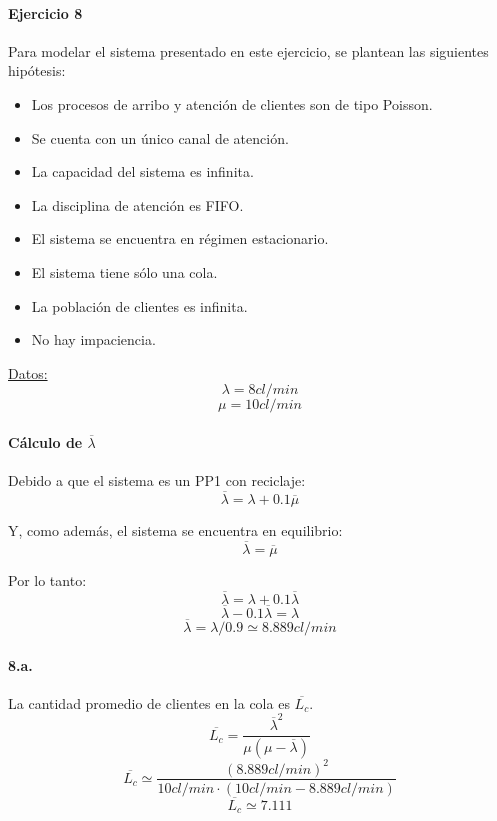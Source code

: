 \documentclass{article}
\begin{document}
\paragraph{Ejercicio 8}
   Para modelar el sistema presentado en este ejercicio, se plantean las siguientes hipótesis:

   \begin{itemize}
      \item Los procesos de arribo y atención de clientes son de tipo Poisson.
      \item Se cuenta con un único canal de atención.
      \item La capacidad del sistema es infinita.
      \item La disciplina de atención es FIFO.
      \item El sistema se encuentra en régimen estacionario.
      \item El sistema tiene sólo una cola.
      \item La población de clientes es infinita.
      \item No hay impaciencia.
   \end{itemize}

   \underline{Datos:} \\
   $$\lambda = 8 cl/min $$
   $$\mu = 10 cl/min $$

   \paragraph{Cálculo de $\overline{\lambda}$}


   Debido a que el sistema es un PP1 con reciclaje:
      $$\overline{\lambda} = \lambda + 0.1 \overline{\mu}$$
   
   Y, como además, el sistema se encuentra en equilibrio:
      $$\overline{\lambda} = \overline{\mu}$$
   
   Por lo tanto:
      $$ \overline{\lambda} = \lambda + 0.1 \overline{\lambda} $$
      $$ \overline{\lambda} - 0.1 \overline{\lambda} = \lambda $$
      $$ \overline{\lambda} = \lambda / 0.9 \simeq 8.889cl/min $$

   \paragraph{8.a.} La cantidad promedio de clientes en la cola es $ \overline{L_{c}}$.
      $$ \overline{L_{c}} = \frac{\overline{\lambda}^2}{\mu (\mu - \overline{\lambda})}$$
      $$ \overline{L_{c}} \simeq  \frac{(8.889cl/min)^2}{10cl/min \cdot (10cl/min - 8.889cl/min)} $$
      $$ \overline{L_{c}} \simeq  7.111 $$
   
\end{document}
